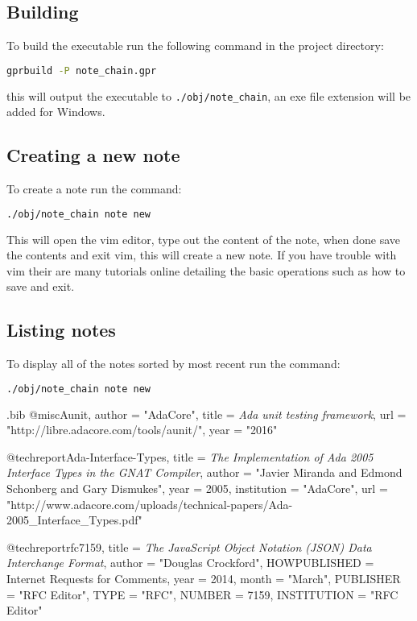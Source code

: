 \documentclass[12pt,a4paper]{article}
\newcommand{\codetext}[1]{\colorbox{light-gray}{\texttt{#1}}}
\begin{document}
\subsection{Building}
To build the executable run the following command in the project directory:

\begin{lstlisting}[language=bash]
  gprbuild -P note_chain.gpr
\end{lstlisting}

\noindent
this will output the executable to \codetext{./obj/note\_chain}, an exe file
extension will be added for Windows.

\subsection{Creating a new note}
To create a note run the command:

\begin{lstlisting}[language=bash]
  ./obj/note_chain note new
\end{lstlisting}

\noindent
This will open the vim editor, type out the content of the note, when done save
the contents and exit vim, this will create a new note. If you have trouble
with vim their are many tutorials online detailing the basic operations such as
how to save and exit.

\subsection{Listing notes}
To display all of the notes sorted by most recent run the command:

\begin{lstlisting}[language=bash]
  ./obj/note_chain note new
\end{lstlisting}





\begin{filecontents}{\jobname.bib}
@misc{Aunit,
  author = "AdaCore",
  title = {\textit{Ada unit testing framework}},
  url = "http://libre.adacore.com/tools/aunit/",
  year = "2016"
}

@techreport{Ada-Interface-Types,
	title = {\textit{The Implementation of Ada 2005 Interface Types in the GNAT Compiler}},
	author = "Javier Miranda and Edmond Schonberg and Gary Dismukes",
	year = 2005,
	institution = "AdaCore",
	url = "http://www.adacore.com/uploads/technical-papers/Ada-2005_Interface_Types.pdf"
}

@techreport{rfc7159,
	title = {\textit{The JavaScript Object Notation (JSON) Data Interchange Format}},
	author = "Douglas Crockford",
	HOWPUBLISHED = {Internet Requests for Comments},
	year = 2014,
	month = "March",
	PUBLISHER = "{RFC Editor}",
	TYPE = "{RFC}",
	NUMBER = 7159,
	INSTITUTION = "{RFC Editor}"
}
\end{filecontents}



\end{document}
